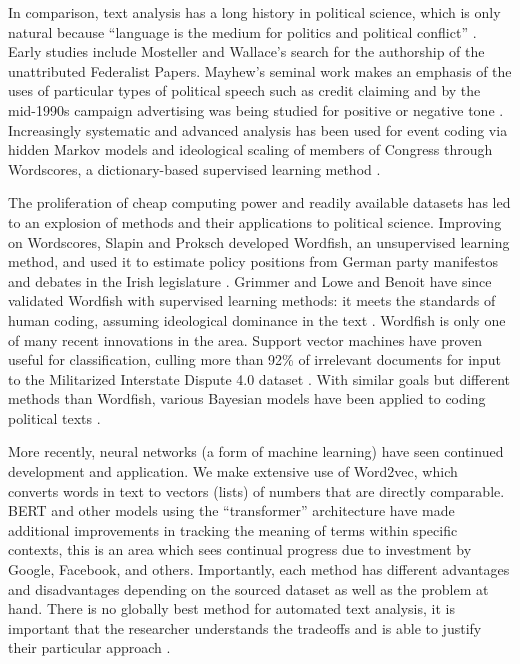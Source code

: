 \documentclass[doublespacing]{utdthesis}
\let\cite=\citep
\begin{document}
In comparison, text analysis has a long history in political science, which is only natural because ``language is the medium for politics and political conflict'' \cite[p. 269]{grimmer2013}.
Early studies include Mosteller and Wallace’s \citeyear{mosteller1963} search for the authorship of the unattributed Federalist Papers.
Mayhew’s seminal work makes an emphasis of the uses of particular types of political speech such as credit claiming and by the mid-1990s campaign advertising was being studied for positive or negative tone \cite{mayhew, iyengar}.
Increasingly systematic and advanced analysis has been used for event coding via hidden Markov models and ideological scaling of members of Congress through Wordscores, a dictionary-based supervised learning method \cite{schrodt2000, laver2003}.

The proliferation of cheap computing power and readily available datasets has led to an explosion of methods and their applications to political science.
Improving on Wordscores, Slapin and Proksch developed Wordfish, an unsupervised learning method, and used it to estimate policy positions from German party manifestos and debates in the Irish legislature \cite{proksch2008, proksch2010}.
Grimmer \citeyear{grimmer2012} and Lowe and Benoit \citeyear{lowe2013} have since validated Wordfish with supervised learning methods: it meets the standards of human coding, assuming ideological dominance in the text \cite{grimmer2012, lowe2013}.
Wordfish is only one of many recent innovations in the area.
Support vector machines have proven useful for classification, culling more than 92\% of irrelevant documents for input to the Militarized Interstate Dispute 4.0 dataset \cite{dorazio2014}.
With similar goals but different methods than Wordfish, various Bayesian models have been applied to coding political texts \cite{grimmer2010, elff2013}.

More recently, neural networks (a form of machine learning) have seen continued development and application.
We make extensive use of Word2vec, which converts words in text to vectors (lists) of numbers that are directly comparable.
BERT and other models using the ``transformer'' architecture have made additional improvements in tracking the meaning of terms within specific contexts, this is an area which sees continual progress due to investment by Google, Facebook, and others.
Importantly, each method has different advantages and disadvantages depending on the sourced dataset as well as the problem at hand.
There is no globally best method for automated text analysis, it is important that the researcher understands the tradeoffs and is able to justify their particular approach \cite{grimmer2013}.
\end{document}
